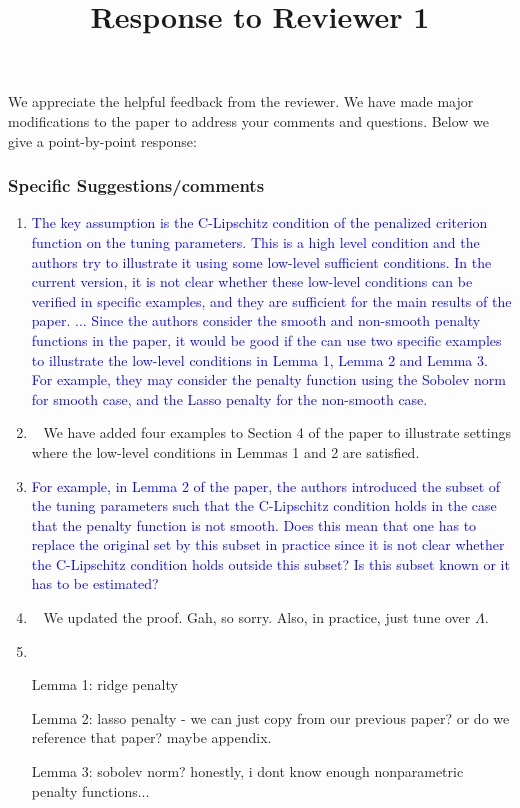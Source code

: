 \documentclass[]{article}
\title{Response to Reviewer 1}
\newcommand{\point}[1]{\item \textcolor{blue}{#1}}
\newcommand{\reply}{\item[]\ }
\begin{document}
	
	\maketitle
	
	We appreciate the helpful feedback from the reviewer.
	We have made major modifications to the paper to address your comments and questions.
	Below we give a point-by-point response:
	
	\subsubsection*{Specific Suggestions/comments}
	
	\begin{enumerate}
		\point{
			The key assumption is the C-Lipschitz condition of the penalized criterion function on the tuning parameters.  This is a high level condition and the authors try to illustrate it using some low-level sufficient conditions.
			In the current version, it is not clear whether these low-level conditions can be verified in specific examples, and they are sufficient for the main results of the paper.
			...
			Since the authors consider the smooth and non-smooth penalty functions in the paper, it would be good if the can use two specific examples to illustrate the low-level conditions in Lemma 1, Lemma 2 and Lemma 3. For example, they may consider the penalty function using the Sobolev norm for smooth case, and the Lasso penalty for the non-smooth case.
		}
		\reply{
		We have added four examples to Section 4 of the paper to illustrate settings where the low-level conditions in Lemmas 1 and 2 are satisfied.
		}
		
		\point{
			For example, in Lemma 2 of the paper, the authors introduced the subset of the tuning parameters such that the C-Lipschitz condition holds in the case that the penalty function is not smooth.
			Does this mean that one has to replace the original set by this subset in practice since it is not clear whether the C-Lipschitz condition holds outside this subset?
			Is this subset known or it has to be estimated?
		}
		\reply{
			We updated the proof. Gah, so sorry.
			Also, in practice, just tune over $\Lambda$.
		}
	
		\reply{
		
			Lemma 1: ridge penalty
		
			Lemma 2: lasso penalty - we can just copy from our previous paper? or do we reference that paper? maybe appendix.
			
			Lemma 3: sobolev norm? honestly, i dont know enough nonparametric penalty functions...
			
}
\end{enumerate}
\end{document}
